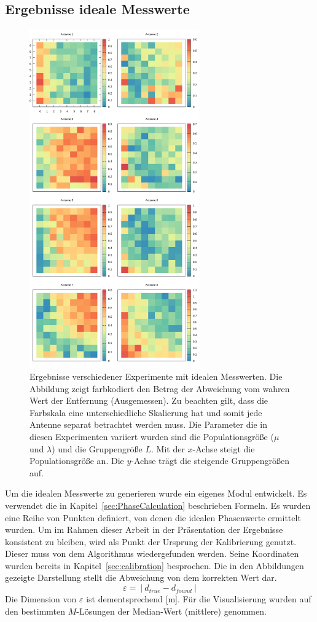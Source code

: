 \subsection{Ergebnisse ideale Messwerte}
%
\begin{figure}[h!]
	\centering
	\caption[Ergebnis-Heatmap - Idealisierte Werte]{ Ergebnisse verschiedener Experimente mit idealen Messwerten. Die Abbildung zeigt farbkodiert den Betrag der Abweichung vom wahren Wert der Entfernung (Ausgemessen). Zu beachten gilt, dass die Farbskala eine unterschiedliche Skalierung hat und somit jede Antenne separat betrachtet werden muss. Die Parameter die in diesen Experimenten variiert wurden sind die Populationsgröße ($\mu$ und $\lambda$) und die Gruppengröße $L$. Mit der $x$-Achse steigt die Populationsgröße an. Die $y$-Achse trägt die steigende Gruppengrößen auf.}
	\label{fig:results1}
	\includegraphics[width=0.65\textwidth]{img/result.png}
\end{figure}
% 
Um die idealen Messwerte zu generieren wurde ein eigenes Modul entwickelt. Es verwendet die in Kapitel~\ref{sec:PhaseCalculation} beschrieben Formeln. Es wurden eine Reihe von Punkten definiert, von denen die idealen Phasenwerte ermittelt wurden. Um im Rahmen dieser Arbeit in der Präsentation der Ergebnisse konsistent zu bleiben, wird als Punkt der Ursprung der Kalibrierung genutzt. Dieser muss von dem Algorithmus wiedergefunden werden. Seine Koordinaten wurden bereits in Kapitel~\ref{sec:calibration} besprochen. Die in den Abbildungen gezeigte Darstellung stellt die Abweichung von dem korrekten Wert dar.
%
$$
\varepsilon=~|~d_{true}-d_{found}~|
$$
%
Die Dimension von $\varepsilon$ ist dementsprechend [m]. Für die Visualisierung wurden auf den bestimmten $M$-Lösungen der Median-Wert (mittlere) genommen. 
%
